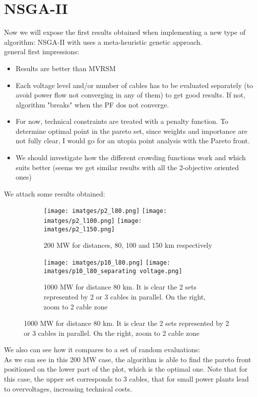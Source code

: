 \documentclass{article}
\begin{document}
\section{NSGA-II
}
Now we will expose the first results obtained when implementing a new type of algorithm: NSGA-II with uses a meta-heuristic genetic approach.\\
general first impressions:
\begin{itemize}
  \item Results are better than MVRSM
  \item Each voltage level and/or number of cables has to be evaluated separately (to avoid power flow not converging in any of them) to get good results. If not, algorithm "breaks" when the PF dos not converge.
  \item For now, technical constraints are treated with a penalty function. To determine optimal point in the pareto set, since weights and importance are not fully clear, I would go for an utopia point analysis with the Pareto front.
  \item We should investigate how the different crowding functions work and which suits better (seems we get similar results with all the 2-objective oriented ones)

\end{itemize}
We attach some results obtained:
\begin{figure}[h]
  \begin{subfigure}{\linewidth}
  \texttt{[image: imatges/p2\_l80.png]}\hfill
  \texttt{[image: imatges/p2\_l100.png]}\hfill
  \texttt{[image: imatges/p2\_l150.png]}
  \caption{200 MW for distances, 80, 100 and 150 km respectively}
  \end{subfigure}\par\medskip
  \begin{subfigure}{\linewidth}
  \texttt{[image: imatges/p10\_l80.png]}\hfill
  \texttt{[image: imatges/p10\_l80\_separating voltage.png]}\hfill
  \caption{1000 MW for distance 80 km. It is clear the 2 sets represented by 2 or 3 cables in parallel. On the right, zoom to 2 cable zone}
  \end{subfigure}\par\medskip
\end{figure}

We also can see how it compares to a set of random evaluations:
\\
As we can see in this 200 MW case, the algorithm is able to find the pareto front 
positioned on the lower part of the plot, which is the optimal one. Note that for this case,
the upper set corresponds to 3 cables, that for small power plants lead to overvoltages, increasing
technical costs.
\end{document}
